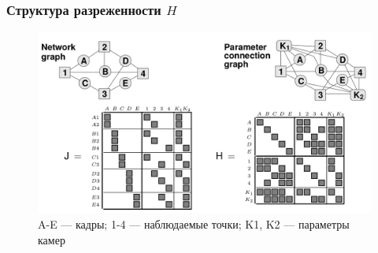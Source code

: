 \documentclass[notheorems,aspectratio=169]{beamer}
\begin{document}
\begin{frame}
  \frametitle{Структура разреженности $H$}
  \begin{figure}
    \includegraphics[height=0.7\textheight, keepaspectratio]{h-struct.png}
    \caption*{A-E --- кадры; 1-4 --- наблюдаемые точки; K1, K2 --- параметры камер}
  \end{figure}
\end{frame}
\end{document}
